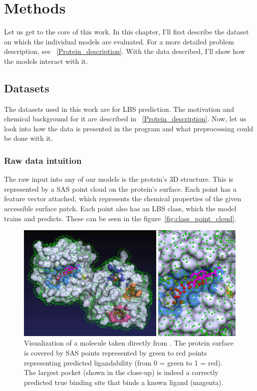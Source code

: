\chapter{Methods}

Let us get to the core of this work. In this chapter, I'll first describe the dataset on which the individual models are evaluated. For a more detailed problem description, see ~\ref{Protein_description}. With the data described, I'll show how the models interact with it.

\section{Datasets}

The datasets used in this work are for \ac{LBS} prediction. The motivation and chemical background for it are described in ~\ref{Protein_description}. Now, let us look into how the data is presented in the program and what preprocessing could be done with it.

\subsection{Raw data intuition}

The raw input into any of our models is the protein's 3D structure. This is represented by a SAS point cloud on the protein's surface. Each point has a feature vector attached, which represents the chemical properties of the given accessible surface patch. Each point also has an LBS class, which the model trains and predicts. These can be seen in the figure~\ref{fig:class_point_cloud}.

\begin{figure}
    \centering
    \includegraphics[width=0.5\linewidth]{p2rank.jpg}
    \caption{Visualization of a molecule taken directly from \cite{P2RANK}. The protein surface is covered by SAS points represented by green to red points representing predicted ligandability  (from 0 = green to 1 = red). The largest pocket (shown in the close-up) is indeed a correctly predicted true binding site that binds a known ligand (magenta).}
    \label{fig:p2rank_visualization}
\end{figure}

